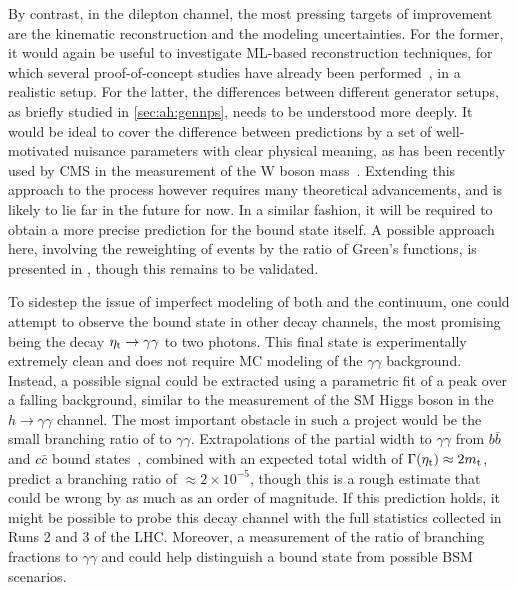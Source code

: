 By contrast, in the dilepton channel, the most pressing targets of improvement are the kinematic reconstruction and the \ttbar modeling uncertainties. For the former, it would again be useful to investigate ML-based reconstruction techniques, for which several proof-of-concept studies have already been performed~\cite{Rubenach:PhD,Raine:2023fko}, in a realistic setup. For the latter, the differences between different generator setups, as briefly studied in \cref{sec:ah:gennps}, needs to be understood more deeply. It would be ideal to cover the difference between predictions by a set of well-motivated nuisance parameters with clear physical meaning, as has been recently used by CMS in the measurement of the W boson mass~\cite{CMS:SMP-23-002,Tackmann:2024kci}. Extending this approach to the \ttbar process however requires many theoretical advancements, and is likely to lie far in the future for now. In a similar fashion, it will be required to obtain a more precise prediction for the \ttbar bound state itself. A possible approach here, involving the reweighting of \ttbar events by the ratio of Green's functions, is presented in , though this remains to be validated.

To sidestep the issue of imperfect modeling of both \etat and the \ttbar continuum, one could attempt to observe the \ttbar bound state in other decay channels, the most promising being the decay $\mathrm{\eta_t} \rightarrow \gamma\gamma$ to two photons. This final state is experimentally extremely clean and does not require MC modeling of the $\gamma\gamma$ background. Instead, a possible signal could be extracted using a parametric fit of a peak over a falling background, similar to the measurement of the SM Higgs boson in the $h \rightarrow \gamma\gamma$ channel. The most important obstacle in such a project would be the small branching ratio of \etat to $\gamma\gamma$. Extrapolations of the partial width to $\gamma\gamma$ from $b\bar{b}$ and $c\bar{c}$ bound states~\cite{Jiang:2024fyw}, combined with an expected total width of $\Gamma(\mathrm{\eta_t}) \approx 2 m_{\mathrm{t}}$, predict a branching ratio of $\approx 2 \times 10^{-5}$, though this is a rough estimate that could be wrong by as much as an order of magnitude. If this prediction holds, it might be possible to probe this decay channel with the full statistics collected in Runs 2 and 3 of the LHC. Moreover, a measurement of the ratio of branching fractions to $\gamma\gamma$ and \ttbar could help distinguish a bound state from possible BSM scenarios.


